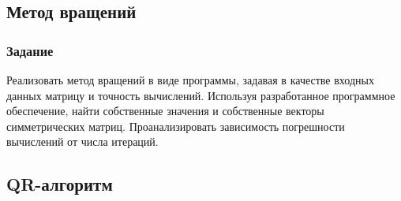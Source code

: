 \documentclass[a4paper,12pt]{article}
\begin{document}
\subsection{Метод вращений}
\subsubsection{Задание}
Реализовать метод вращений в виде программы, задавая в качестве входных
данных матрицу и точность вычислений. Используя разработанное программное
обеспечение, найти собственные значения и собственные векторы
симметрических матриц. Проанализировать зависимость погрешности
вычислений от числа итераций.

\newpage

\subsection{QR-алгоритм}
\end{document}
